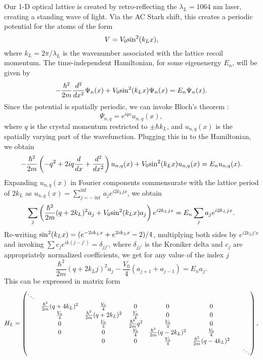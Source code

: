 	Our 1-D optical lattice is created by retro-reflecting the  $\lambda_L = 1064 $ nm laser, creating a standing wave of light. Via the AC Stark shift, this creates a periodic potential for the atoms of the form
\begin{equation}
V = V_0 {\rm sin}^2 (k_L x),
\end{equation} 
where $k_L = 2\pi/\lambda_L$ is the wavenumber associated with the lattice recoil momentum. The time-independent Hamiltonian, for some eigenenergy $E_n$, will be given by
\begin{equation}
-\frac{\hbar^2}{2 m}\frac{d^2}{dx^2}\Psi_n(x)+V_0 {\rm sin}^2 (k_L x) \Psi_n(x) = E_n \Psi_n(x).
\end{equation}
Since the potential is spatially periodic, we can invoke Bloch's theorem \cite{Ashcroft}:
\begin{equation}
\Psi_{n,q} =  e^{iqx}u_{n,q}(x), 
\end{equation}
where $q$ is the crystal momentum restricted to $\pm\hbar k_L$, and $u_{n,q}(x)$ is the spatially varying part of the wavefunction. 
Plugging this in to the Hamiltonian, we obtain
\begin{equation}
-\frac{\hbar^2}{2m}\left(-q^2 + 2iq\frac{d}{dx} + \frac{d^2}{dx^2}\right) u_{n,q}(x) + V_0{\rm sin}^2(k_L x) u_{n,q}(x) = E_n u_{n,q}(x).
\end{equation}
Expanding $u_{n,q}(x)$  in Fourier components commensurate with the lattice period of $2 k_L$ as $u_{n,q}(x) = \sum_{j=-\inf}^{\inf} a_j e^{i 2 k_L j x}$, we obtain
\begin{equation}
\sum_j \left(\frac{\hbar^2}{2m}(q + 2 k_L)^2 a_j + V_0 {\rm sin}^2(k_L x) a_j\right) e^{i 2 k_L j x} = E_n\sum_j a_j  e^{i 2 k_L j x}.
\end{equation}
Re-writing ${\rm sin}^2(k_L x) = (e^{-2ik_L x} + e^{2 i k_L x} - 2)/4$, multiplying both sides by $e^{i 2 k_L j' x}$ and invoking $\sum c_j e^{i k (j-j')} = \delta_{jj'}$, where $\delta_{j j'}$ is the Kroniker delta and $c_j$ are appropriately normalized coefficients, we get for any value of the index $j$
\begin{equation}
\frac{\hbar^2}{2m}(q + 2 k_L j)^2 a_j - \frac{V_0}{4}(a_{j+1}+a_{j-1}) = E_n a_j.
\end{equation}
This can be expressed in matrix form
\begin{equation}
H_L =
 \begin{pmatrix} \ddots &  & & & & & & \\ 
 & \frac{\hbar^2}{2m}(q + 4 k_L )^2 & \frac{V_0}{4} & 0 & 0 & 0 &  \\
 & \frac{V_0}{4} &\frac{\hbar^2}{2m}(q + 2 k_L )^2 & \frac{V_0}{4} & 0 & 0 &  \\
& 0 & \frac{V_0}{4} & \frac{\hbar^2}{2m}q^2 & \frac{V_0}{4} & 0 &  \\
 & 0 & 0 & \frac{V_0}{4} & \frac{\hbar^2}{2m}(q - 2 k_L)^2 &\frac{V_0}{4} &  \\
 &  & 0 & 0 & \frac{V_0}{4} & \frac{\hbar^2}{2m}(q - 4 k_L)^2 &  \\
& & & & & & &  \ddots \end{pmatrix} \\,
\end{equation}
